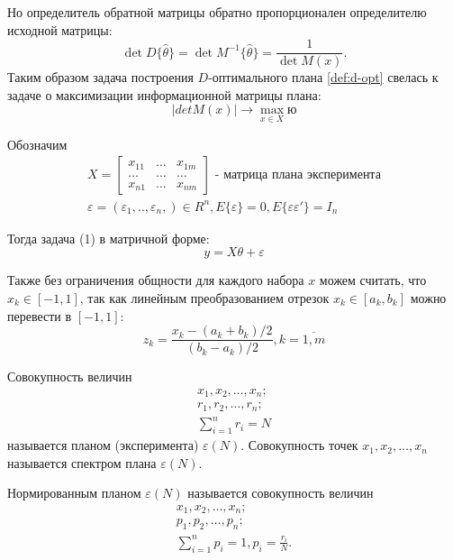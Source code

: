 Но определитель обратной матрицы обратно пропорционален определителю исходной матрицы:
\begin{equation*}
\det {D\{\hat \theta\}} = \det {M^{-1}\{\hat \theta\}} = \frac 1 {\det M(x)}.
\end{equation*}
Таким образом задача построения $D$-оптимального плана \ref{def:d-opt} свелась к задаче о максимизации информационной матрицы плана:
\begin{equation}
|det M(x)| \rightarrow \max_{x \in X}ю
\end{equation}

Обозначим
\begin{gather}
X = 
\begin{bmatrix}
x_{11}	&	\dots	&	x_{1m}\\
\dots	&	\dots	&	\dots\\
x_{n1}	&	\dots	&	x_{nm}
\end{bmatrix} \text{ - матрица плана эксперимента} \\
\varepsilon = (\varepsilon_1,.., \varepsilon_n,) \in R^n, E\{\varepsilon\} = 0, E\{\varepsilon \varepsilon'\}=I_n
\end{gather}

Тогда задача (1) в матричной форме:
\begin{equation}
y = X \theta + \varepsilon
\end{equation}

Также без ограничения общности для каждого набора $x$ можем считать, что  $x_k \in [-1, 1]$, так как линейным преобразованием отрезок $x_k \in [a_k, b_k]$ можно перевести в $[-1, 1]$:
$$z_k = \frac{x_k - (a_k + b_k)/2}{(b_k - a_k)/2}, k = \overline{1, m}$$  

\begin{definition}
	Совокупность величин
	\begin{gather}
	x_1, x_2, \dots, x_n;\\
	r_1, r_2, \dots, r_n;\\
	\sum_{i=1}^n r_i = N
	\end{gather}
	называется планом (эксперимента) $\varepsilon(N)$. Совокупность точек  $x_1, x_2, \dots, x_n$ называется спектром плана $\varepsilon(N)$.
\end{definition}

\begin{definition}
	Нормированным планом $\varepsilon(N)$ называется совокупность величин
	\begin{gather}
	x_1, x_2, \dots, x_n;\\
	p_1, p_2, \dots, p_n;\\
	\sum_{i = 1}^n p_i = 1, p_i = \frac {r_i} {N}.
	\end{gather}
\end{definition}

